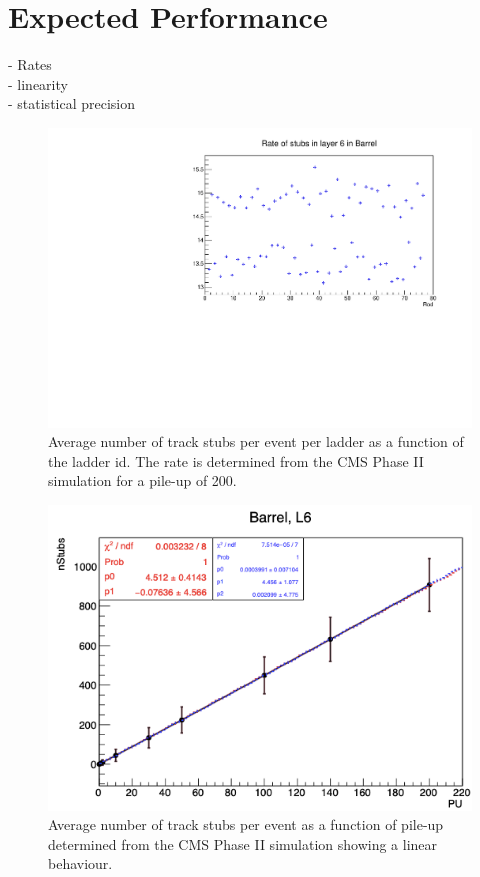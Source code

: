 

\section{Expected Performance}
- Rates\\
- linearity \\
- statistical precision




\begin{figure}[hbtp]
\centering
\includegraphics[width=.6\linewidth]{tex/Part2/fig/OT/OT-Rates.pdf}
\caption{
  Average number of track stubs per event per ladder as a function of the ladder id.
  The rate is determined from the CMS Phase II simulation for a pile-up of 200.
}
\label{fig:OT_rates}
\end{figure}


\begin{figure}[hbtp]
\centering
\includegraphics[width=.6\linewidth]{tex/Part2/fig/OT/OT-linearity.png}
\caption{
 Average number of track stubs per event as a function of pile-up determined from the CMS Phase II simulation showing a linear behaviour.
} 
\label{fig:OT_linearity}
\end{figure}
